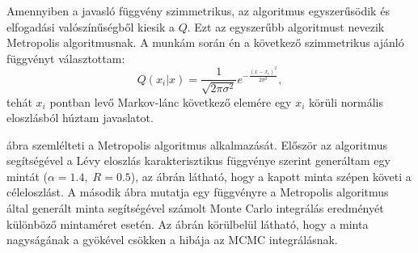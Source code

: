 \documentclass[10pt,a4paper]{article}
\numberwithin{equation}{subsection}
\numberwithin{figure}{section}
\begin{document}
Amennyiben a javasló függvény szimmetrikus, az algoritmus egyszerűsödik és ~ elfogadási valószínűségből kiesik a $Q$. Ezt az egyszerűbb algoritmust nevezik Metropolis algoritmusnak. A munkám során én a következő szimmetrikus ajánló függvényt választottam:
\begin{equation}
Q(x_i|x) = \frac{1}{\sqrt{2\pi\sigma^2}}e^{-\frac{(x-x_i)^2}{2\sigma^2}},
\end{equation}
tehát $x_i$ pontban levő Markov-lánc következő elemére egy $x_i$ körüli normális eloszlásból húztam javaslatot.

 ábra szemlélteti a Metropolis algoritmus alkalmazását. Először az algoritmus segítségével a Lévy eloszlás karakterisztikus függvénye szerint generáltam egy mintát ($\alpha=1.4,\;R=0.5$), az ábrán látható, hogy a kapott minta szépen követi a céleloszlást. A második ábra mutatja egy függvényre a Metropolis algoritmus által generált minta segítségével számolt Monte Carlo integrálás eredményét különböző mintaméret esetén. Az ábrán körülbelül látható, hogy a minta nagyságának a gyökével csökken a hibája az MCMC integrálásnak.
\end{document}
